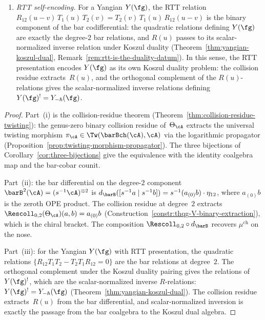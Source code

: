 \begin{theorem}
\begin{enumerate}[label=\textup{(\roman*)}]
\item \emph{RTT self-encoding.}
 For a Yangian $Y(\fg)$, the RTT relation
 $R_{12}(u{-}v)\, T_1(u)\, T_2(v)
 = T_2(v)\, T_1(u)\, R_{12}(u{-}v)$
 is the binary component of the bar codifferential: the
 quadratic relations defining $Y(\fg)$ are exactly the
 degree-$2$ bar relations, and $R(u)$ passes to its
 scalar-normalized inverse relation under Koszul duality
 \textup{(}Theorem~\textup{\ref{thm:yangian-koszul-dual}},
 Remark~\textup{\ref{rem:rtt-is-the-duality-datum})}.
 In this sense, the RTT presentation encodes $Y(\fg)$ as its
 own Koszul duality problem: the collision residue
 extracts~$R(u)$, and the orthogonal complement of the
 $R(u)$-relations gives the scalar-normalized inverse relations
 defining $Y(\fg)^! = Y_{-\hbar}(\fg)$.
\end{enumerate}
\end{theorem}

\begin{proof}
Part~(i) is the collision-residue theorem
(Theorem~\ref{thm:collision-residue-twisting}):
the genus-zero binary collision residue of~$\Theta_\cA$ extracts
the universal twisting morphism
$\pi_\cA \in \Tw(\barBch(\cA), \cA)$
via the logarithmic propagator
(Proposition~\ref{prop:twisting-morphism-propagator}).
The three bijections of Corollary~\ref{cor:three-bijections}
give the equivalence with the identity coalgebra map and the
bar-cobar counit.

Part~(ii): the bar differential on the degree-$2$ component
$\barB^2(\cA) = (s^{-1}\cA)^{\otimes 2}$ is
$d_{\barB}([s^{-1}a \mid s^{-1}b])
= s^{-1}(a_{(0)}b) \cdot \eta_{12}$,
where $a_{(0)}b$ is the zeroth OPE product.
The collision residue at degree~$2$ extracts
$\Rescoll_{0,2}(\Theta_\cA)(a,b) = a_{(0)}b$
(Construction~\ref{constr:thqg-V-binary-extraction}),
which is the chiral bracket. The composition
$\Rescoll_{0,2} \circ d_{\barB}$ recovers
$\mu^{\mathrm{ch}}$ on the nose.

Part~(iii): for the Yangian $Y(\fg)$ with RTT presentation,
the quadratic relations $\{R_{12}T_1T_2 - T_2T_1R_{12} = 0\}$
are the bar relations at degree~$2$. The orthogonal complement
under the Koszul duality pairing gives the relations of~$Y(\fg)^!$,
which are the scalar-normalized inverse $R$-relations:
$Y(\fg)^! = Y_{-\hbar}(\fg)$
(Theorem~\ref{thm:yangian-koszul-dual}). The collision residue
extracts~$R(u)$ from the bar differential, and scalar-normalized
inversion is exactly the passage from the bar coalgebra to the Koszul
dual algebra.
\end{proof}

